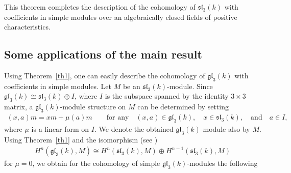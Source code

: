 \documentclass[pdftex]{sigma}%
\numberwithin{equation}{section}
\begin{document}
This theorem completes the description of the cohomology of $\mathfrak{sl}_3(k)$ with coefficients in simple modules over an algebraically closed fields of positive characteristics.

\subsection{Some applications of the main result}

Using Theorem~\ref{th1}, one can easily describe the cohomology of $\mathfrak{gl}_3(k)$ with coefficients in simple modules. Let $M$ be an $\mathfrak{sl}_3(k)$-module.
Since $\mathfrak{gl}_3(k)\cong \mathfrak{sl}_3(k)\oplus I$, where $I$ is the subspace spanned by the identity
$3\times 3$ matrix, a $\mathfrak{gl}_3(k)$-module structure on $M$ can be
determined by setting
\begin{gather}
(x,a)m=xm+\mu(a)m\qquad \text{for any}\quad (x,a)\in \mathfrak{gl}_3(k),\quad
x\in\mathfrak{sl}_3(k),\quad\text{and}\quad a\in I,\label{eq0}
\end{gather}
where $\mu$ is a linear form on $I$. We denote the obtained $\mathfrak{gl}_3(k)$-module
also by $M$. Using Theorem~\ref{th1} and the isomorphism (see \cite[p.~737]{IT21})
\begin{gather*}
H^n(\mathfrak{gl}_3(k),M)\cong H^n(\mathfrak{sl}_3(k),M)\oplus H^{n-1}(\mathfrak{sl}_3(k),M)
\end{gather*}
for $\mu=0$, we obtain for the cohomology of simple $\mathfrak{gl}_3(k)$-modules the following
\end{document}
